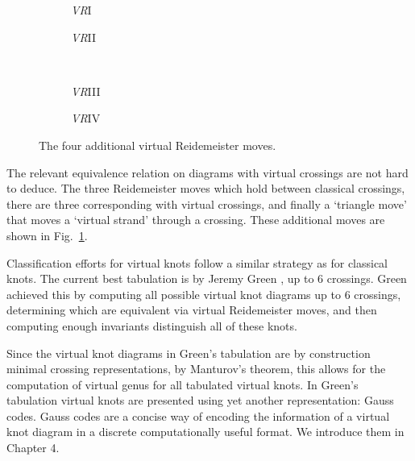 \documentclass[12pt]{report}
\begin{document}
\begin{figure}[h!]
	\centering
	\hspace*{\fill}
	\begin{subfigure}[b]{0.35 \textwidth}
		\centering
		\def\svgscale{0.22}
		
		\caption{\textit{VR}I}
	\end{subfigure}
	\hspace*{\fill}
	\begin{subfigure}[b]{0.35 \textwidth}
		\centering
		\def\svgscale{0.22}
		
		\caption{\textit{VR}II}
	\end{subfigure}
	\hspace*{\fill}
	\\
	\hspace*{\fill}
	\begin{subfigure}[b]{0.35 \textwidth}
		\centering
		\def\svgscale{0.22}
		
		\caption{\textit{VR}III}
	\end{subfigure}
	\hspace*{\fill}
	\begin{subfigure}[b]{0.35 \textwidth}
		\centering
		\def\svgscale{0.22}
		
		\caption{\textit{VR}IV}
	\end{subfigure}
	\hspace*{\fill}
	\caption{The four additional virtual Reidemeister moves.}
	\label{fig:virtual-reidemeister-moves}
\end{figure}

The relevant equivalence relation on diagrams with virtual crossings are not hard to deduce. The three Reidemeister moves which hold between classical crossings, there are three corresponding with virtual crossings, and finally a `triangle move' that moves a `virtual strand' through a crossing. These additional moves are shown in Fig.~\ref{fig:virtual-reidemeister-moves}.

Classification efforts for virtual knots follow a similar strategy as for classical knots. The current best tabulation is by Jeremy Green \cite{virtual-knot-table}, up to 6 crossings. Green achieved this by computing all possible virtual knot diagrams up to $6$ crossings, determining which are equivalent via virtual Reidemeister moves, and then computing enough invariants distinguish all of these knots.

Since the virtual knot diagrams in Green's tabulation are by construction minimal crossing representations, by Manturov's theorem, this allows for the computation of virtual genus for all tabulated virtual knots. In Green's tabulation virtual knots are presented using yet another representation: Gauss codes. Gauss codes are a concise way of encoding the information of a virtual knot diagram in a discrete computationally useful format. We introduce them in Chapter 4.
\end{document}
